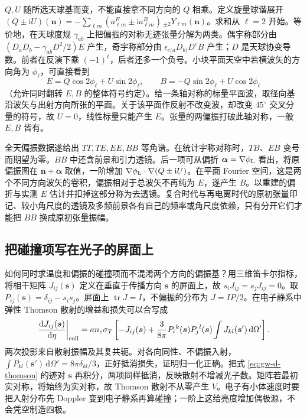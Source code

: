 $Q,U$ 随所选天球基而变，不能直接拿不同方向的 $Q$ 相乘。定义旋量球谐展开 $(Q\pm\mathrm iU)(\bm n)=-\sum_{\ell m}(a^E_{\ell m}\pm\mathrm i a^B_{\ell m})\,{}_{\pm2}Y_{\ell m}(\bm n)$。求和从 $\ell=2$ 开始。等价地，在天球度规 $\gamma_{ab}$ 上把偏振的对称无迹张量分解为两类。偶宇称部分由 $(D_aD_b-\gamma_{ab}D^2/2)E$ 产生，奇宇称部分由 $\epsilon_{c(a}D_{b)}D^c B$ 产生；$D$ 是天球协变导数。前者在反演下乘 $(-1)^\ell$，后者还多一个负号。小块平面天空中若横波矢的方向角为 $\phi_\ell$，可直接看到
\[
 E=Q\cos2\phi_\ell+U\sin2\phi_\ell,\qquad
 B=-Q\sin2\phi_\ell+U\cos2\phi_\ell
\]
（允许同时翻转 $E,B$ 的整体符号约定）。给一条轴对称的标量平面波，取径向基沿波矢与出射方向所张的平面。关于该平面作反射不改变波，却改变 $45^\circ$ 交叉分量的符号，故 $U=0$，线性标量只能产生 $E$。张量的两偏振打破此轴对称，一般 $E,B$ 皆有。

全天偏振数据遂给出 $TT,TE,EE,BB$ 等角谱。在统计宇称对称时，$TB$、$EB$ 变号而期望为零。$BB$ 中还含前景和引力透镜。后一项可从偏折 $\bm\alpha=\nabla\phi_{\rm L}$ 看出，将原偏振图在 $\bm n+\bm\alpha$ 取值，一阶增加 $\nabla\phi_{\rm L}\cdot\nabla(Q\pm\mathrm iU)$。在平面 Fourier 空间，这是两个不同方向波矢的卷积，偏振相对于总波矢不再纯为 $E$，遂产生 $B$。以重建的偏折与实测 $E$ 估计并扣掉这部分称为去透镜。复合时代与再电离时代的原初张量印记、较小角尺度的透镜及多频前景各有自己的频率或角尺度依赖，只有分开它们才能把 $BB$ 换成原初张量振幅。


\subsection{把碰撞项写在光子的屏面上}

如何同时求温度和偏振的碰撞项而不混淆两个方向的偏振基？用三维笛卡尔指标，将相干矩阵 $J_{ij}(\bm s)$ 定义在垂直于传播方向 $\bm s$ 的屏面上，故 $s_iJ_{ij}=s_jJ_{ij}=0$。取 $P_{ij}(\bm s)=\delta_{ij}-s_is_j$。屏面上 $\operatorname{tr}J=I$，不偏振的分布为 $J=I P/2$。在电子静系中弹性 Thomson 散射的增益和损失可以合写成
\begin{equation}\label{eq:gw-d-thomson}
 \left.\frac{\mathrm dJ_{ij}(\bm s)}{\mathrm d\eta}\right|_{\rm coll}
 =a n_e\sigma_T\left[
  -J_{ij}(\bm s)+\frac{3}{8\pi}P_i{}^k(\bm s)P_j{}^l(\bm s)
  \int J_{kl}(\bm s')\,\mathrm d\Omega'\right].
\end{equation}
两次投影来自散射振幅及其复共轭。对各向同性、不偏振入射，$\int P_{kl}(\bm s')\,\mathrm d\Omega'=8\pi\delta_{kl}/3$，正好抵消损失，证明归一化正确。把式 \eqref{eq:gw-d-thomson} 的迹对 $\bm s$ 再积分，两项同样抵消，反映散射不增减光子数。矩阵若最初实对称，将始终为实对称，故 Thomson 散射不从零产生 $V$。电子有小体速度时要把入射分布先 Doppler 变到电子静系再算碰撞；一阶上这给亮度增加偶极源，不会凭空制造四极。

